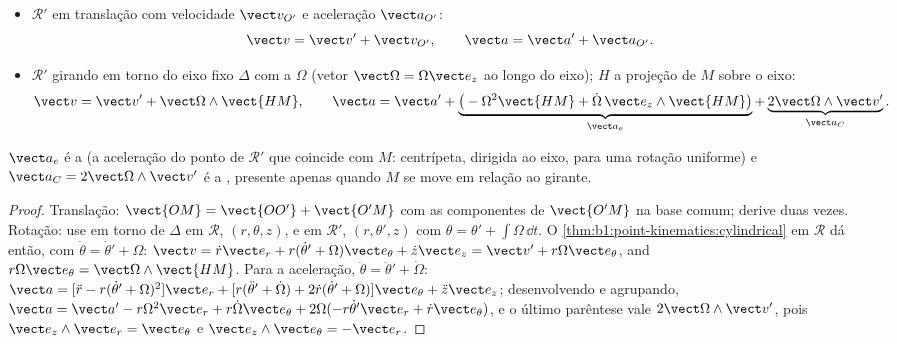 \begin{theorem}\label{thm:b1:non-inertial-frames:composition}
\begin{itemize}
  \item $\mathcal R'$ em translação com velocidade $\vect v_{O'}$ e
        aceleração $\vect a_{O'}$:
        \[
        \vect v = \vect v' + \vect v_{O'}, \qquad \vect a = \vect a' + \vect a_{O'} .
        \]
  \item $\mathcal R'$ girando em torno do eixo fixo $\Delta$ com a  $\Omega$ (vetor $\vect\Omega = \Omega\vect e_z$ ao longo do
        eixo); $H$ a projeção de $M$ sobre o eixo:
        \[
        \vect v = \vect v' + \vect\Omega\wedge\vect{HM}, \qquad
        \vect a = \vect a' + \underbrace{\big(-\Omega^2\vect{HM} + \dot\Omega\,\vect e_z\wedge\vect{HM}\big)}_{\vect a_e}
        + \underbrace{2\vect\Omega\wedge\vect v'}_{\vect a_C} .
        \]
\end{itemize}
$\vect a_e$ é a \emph{} (a aceleração do ponto de
$\mathcal R'$ que coincide com $M$: centrípeta, dirigida ao eixo, para uma
rotação uniforme) e $\vect a_C = 2\vect\Omega\wedge\vect v'$ é a
\emph{}, presente apenas quando $M$ se move em
relação ao  girante.
\end{theorem}

\begin{proof}
Translação: $\vect{OM} = \vect{OO'} + \vect{O'M}$ com as componentes de
$\vect{O'M}$ na base comum; derive duas vezes. Rotação: use  em torno de $\Delta$ em $\mathcal R$, $(r, \theta, z)$, e em
$\mathcal R'$, $(r, \theta', z)$ com $\theta = \theta' + \int\Omega\,\dd t$.
O \cref{thm:b1:point-kinematics:cylindrical} em $\mathcal R$ dá então, com
$\dot\theta = \dot\theta' + \Omega$:
$\vect v = \dot r\vect e_r + r(\dot\theta' + \Omega)\vect e_\theta + \dot z\vect e_z
= \vect v' + r\Omega\vect e_\theta$, and $r\Omega\vect e_\theta = \vect\Omega\wedge\vect{HM}$.
Para a aceleração, $\ddot\theta = \ddot\theta' + \dot\Omega$:
$\vect a = [\ddot r - r(\dot\theta' + \Omega)^2]\vect e_r + [r(\ddot\theta' + \dot\Omega)
+ 2\dot r(\dot\theta' + \Omega)]\vect e_\theta + \ddot z\vect e_z$; desenvolvendo e
agrupando, $\vect a = \vect a' - r\Omega^2\vect e_r + r\dot\Omega\vect e_\theta
+ 2\Omega(-r\dot\theta'\vect e_r + \dot r\vect e_\theta)$, e o último parêntese vale
$2\vect\Omega\wedge\vect v'$, pois $\vect e_z\wedge\vect e_r = \vect e_\theta$ e
$\vect e_z\wedge\vect e_\theta = -\vect e_r$.
\end{proof}

